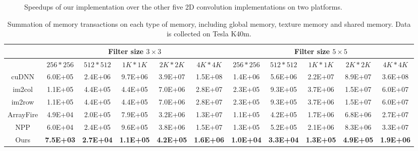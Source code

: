 \begin{figure}
\caption{Speedups of our implementation over the other five 2D convolution implementations on two platforms.}
\label{fig:2druntime}
\end{figure}

\begin{table}[]
\caption{Summation of memory transactions on each type of memory, including global memory, texture memory and shared memory. Data is collected on Tesla K40m.}
\label{tab:2dmemtrans}
\begin{tabular}{c|ccccc|ccccc}
\hline
\multicolumn{1}{l|}{}                & \multicolumn{5}{c|}{Filter size $3 \times 3$}                                                & \multicolumn{5}{c}{Filter size $5 \times 5$}                                                \\ \hline
                                                       & $256 * 256$      & $512 * 512$      & $1K * 1K$        & $2K * 2K$        & $4K * 4K$        & $256 * 256$      & $512 * 512$      & $1K * 1K$        & $2K * 2K$        & $4K * 4K$        \\ \hline
cuDNN                                                  & 6.0E+05          & 2.4E+06          & 9.7E+06          & 3.9E+07          & 1.5E+08          & 1.4E+06          & 5.6E+06          & 2.2E+07          & 8.9E+07          & 3.6E+08          \\
 im2col & 1.1E+05          & 4.4E+05          & 4.4E+05          & 7.0E+06          & 2.8E+07          & 2.3E+05          & 9.3E+05          & 3.7E+06          & 1.5E+07          & 6.0E+07          \\
im2row & 1.1E+05          & 4.4E+05          & 4.4E+05          & 7.0E+06          & 2.8E+07          & 2.3E+05          & 9.3E+05          & 3.7E+06          & 1.5E+07          & 6.0E+07          \\
ArrayFire                                              & 4.9E+04          & 2.0E+05          & 7.9E+05          & 3.2E+06          & 1.3E+07          & 1.1E+05          & 4.2E+05          & 1.7E+06          & 6.8E+06          & 2.7E+07          \\
NPP                                                    & 6.0E+04          & 2.4E+05          & 9.6E+05          & 3.8E+06          & 1.5E+07          & 1.3E+05          & 5.2E+05          & 2.1E+06          & 8.3E+06          & 3.3E+07          \\
Ours                                                   & \textbf{7.5E+03} & \textbf{2.7E+04} & \textbf{1.1E+05} & \textbf{4.2E+05} & \textbf{1.6E+06} & \textbf{1.0E+04} & \textbf{3.3E+04} & \textbf{1.3E+05} & \textbf{4.9E+05} & \textbf{1.9E+06} \\ \hline
\end{tabular}
\end{table}

